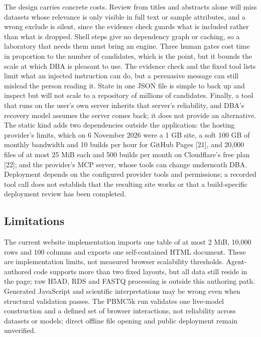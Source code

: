 \documentclass[11pt,a4paper]{article}
\begin{document}
The design carries concrete costs. Review from titles and abstracts
alone will miss datasets whose relevance is only visible in full text or
sample attributes, and a wrong exclude is silent, since the evidence
check guards what is included rather than what is dropped. Shell steps
give no dependency graph or caching, so a laboratory that needs them
must bring an engine. Three human gates cost time in proportion to the
number of candidates, which is the point, but it bounds the scale at
which DBA is pleasant to use. The evidence check and the fixed tool
lists limit what an injected instruction can do, but a persuasive
message can still mislead the person reading it. State in one JSON file
is simple to back up and inspect but will not scale to a repository of
millions of candidates. Finally, a tool that runs on the user's own
server inherits that server's reliability, and DBA's recovery model
assumes the server comes back; it does not provide an alternative. The
static kind adds two dependencies outside the application: the hosting
provider's limits, which on 6 November 2026 were a 1 GB site, a soft 100
GB of monthly bandwidth and 10 builds per hour for GitHub Pages
{[}21{]}, and 20,000 files of at most 25 MiB each and 500 builds per
month on Cloudflare's free plan {[}22{]}; and the provider's MCP server,
whose tools can change underneath DBA. Deployment depends on the configured provider tools and permissions;
a recorded tool call does not establish that the resulting site works or
that a build-specific deployment review has been completed.

\subsection{Limitations}\label{limitations}

The current website implementation imports one table of at most 2 MiB,
10,000 rows and 100 columns and exports one self-contained HTML document.
These are implementation limits, not measured browser scalability
thresholds. Agent-authored code supports more than two fixed layouts,
but all data still reside in the page; raw H5AD, RDS and FASTQ processing
is outside this authoring path. Generated JavaScript and scientific
interpretations may be wrong even when structural validation passes.
The PBMC5k run validates one live-model construction and a defined set
of browser interactions, not reliability across datasets or models;
direct offline file opening and public deployment remain unverified.
\end{document}
